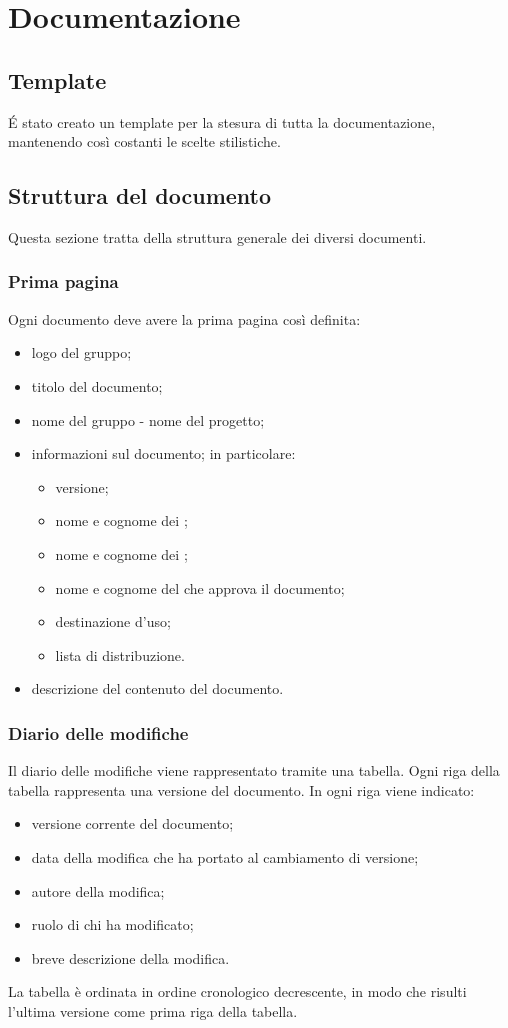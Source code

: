 \section{Documentazione}

\subsection{Template}
É stato creato un template \glossario{\LaTeX{}} per la stesura di tutta la documentazione, mantenendo così costanti le scelte stilistiche.

\subsection{Struttura del documento}
Questa sezione tratta della struttura generale dei diversi documenti.

\subsubsection{Prima pagina}
Ogni documento deve avere la prima pagina così definita:
\begin{itemize}
\item logo del gruppo;
\item titolo del documento;
\item nome del gruppo - nome del progetto;
\item informazioni sul documento; in particolare:
	\begin{itemize}
		\item versione;
		\item nome e cognome dei \Redattori{};
		\item nome e cognome dei \Verificatori{};
		\item nome e cognome del \Responsabile{} che approva il documento;
		\item destinazione d'uso;
		\item lista di distribuzione. 
	\end{itemize}
\item descrizione del contenuto del documento.
\end{itemize}

\subsubsection{Diario delle modifiche}
Il diario delle modifiche viene rappresentato tramite una tabella. Ogni riga della tabella rappresenta una versione del documento. In ogni riga viene indicato: 
\begin{itemize}
	\item versione corrente del documento; 
	\item data della modifica che ha portato al cambiamento di versione; 
	\item autore della modifica;
	\item ruolo di chi ha modificato; 
	\item breve descrizione della modifica. 
\end{itemize}
La tabella è ordinata in ordine cronologico decrescente, in modo che risulti l'ultima versione come prima riga della tabella.

